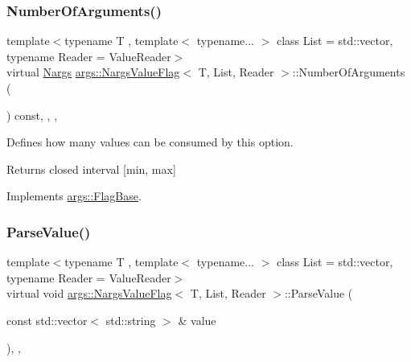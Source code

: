 \mbox{\label{classargs_1_1_nargs_value_flag_a8db7ce6ec0d27f649dbfb1bba908078a}} 
\subsubsection{\texorpdfstring{Number\+Of\+Arguments()}{NumberOfArguments()}}
{\footnotesize\ttfamily template$<$typename T , template$<$ typename... $>$ class List = std\+::vector, typename Reader  = Value\+Reader$>$ \\
virtual \hyperlink{structargs_1_1_nargs}{Nargs} \hyperlink{classargs_1_1_nargs_value_flag}{args\+::\+Nargs\+Value\+Flag}$<$ T, List, Reader $>$\+::Number\+Of\+Arguments (\begin{DoxyParamCaption}{ }\end{DoxyParamCaption}) const\hspace{0.3cm}{\ttfamily [inline]}, {\ttfamily [override]}, {\ttfamily [virtual]}, {\ttfamily [noexcept]}}

Defines how many values can be consumed by this option.

\begin{DoxyReturn}{Returns}
closed interval \mbox{[}min, max\mbox{]} 
\end{DoxyReturn}


Implements \hyperlink{classargs_1_1_flag_base_a6007ffeaa767893cb8eff5333d61673b}{args\+::\+Flag\+Base}.

\mbox{\label{classargs_1_1_nargs_value_flag_aa1ef4abaec468d69c89c02dd8bfdbf38}} 
\subsubsection{\texorpdfstring{Parse\+Value()}{ParseValue()}}
{\footnotesize\ttfamily template$<$typename T , template$<$ typename... $>$ class List = std\+::vector, typename Reader  = Value\+Reader$>$ \\
virtual void \hyperlink{classargs_1_1_nargs_value_flag}{args\+::\+Nargs\+Value\+Flag}$<$ T, List, Reader $>$\+::Parse\+Value (\begin{DoxyParamCaption}\item[{const std\+::vector$<$ std\+::string $>$ \&}]{value }\end{DoxyParamCaption})\hspace{0.3cm}{\ttfamily [inline]}, {\ttfamily [override]}, {\ttfamily [virtual]}}

